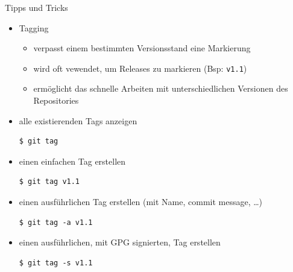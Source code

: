 \begin{frame}{Tipps und Tricks}
  \begin{itemize}
    \item Tagging
    \begin{itemize}
      \item verpasst einem bestimmten Versionsstand eine Markierung
      \item wird oft vewendet, um Releases zu markieren (Bsp: \texttt{v1.1})
      \item ermöglicht das schnelle Arbeiten mit unterschiedlichen Versionen des Repositories
    \end{itemize}
  \item alle existierenden Tags anzeigen
    \begin{lstlisting}
$ git tag
    \end{lstlisting}
  \item einen einfachen Tag erstellen
    \begin{lstlisting}
$ git tag v1.1
    \end{lstlisting}
  \item einen ausführlichen Tag erstellen (mit Name, commit message, \ldots)
    \begin{lstlisting}
$ git tag -a v1.1
    \end{lstlisting}
  \item einen ausführlichen, mit GPG signierten, Tag erstellen
    \begin{lstlisting}
$ git tag -s v1.1
    \end{lstlisting}
  \end{itemize}
\end{frame}

